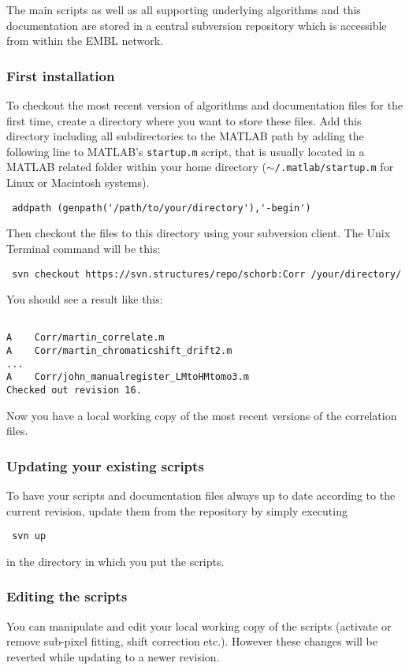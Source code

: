 \documentclass[10pt,a4paper,onepage,DIV12]{scrartcl}
\begin{document}
The main scripts as well as all supporting underlying algorithms and this documentation are stored in a central subversion repository which is accessible from within the EMBL network.
\subsubsection*{First installation}
To checkout the most recent version of algorithms and documentation files for the first time, create a directory where you want to store these files. Add this directory including all subdirectories to the MATLAB path by adding the following line to MATLAB's \texttt{startup.m} script, that is usually located in a MATLAB related folder within your home directory (\texttt{$\sim$/.matlab/startup.m} for Linux or Macintosh systems).
\begin{verbatim}
 addpath (genpath('/path/to/your/directory'),'-begin')
\end{verbatim}
Then checkout the files to this directory using your subversion client. The Unix Terminal command will be this:
\begin{verbatim}
 svn checkout https://svn.structures/repo/schorb:Corr /your/directory/
\end{verbatim}
You should see a result like this:
\begin{verbatim}

A    Corr/martin_correlate.m
A    Corr/martin_chromaticshift_drift2.m
...
A    Corr/john_manualregister_LMtoHMtomo3.m
Checked out revision 16.

\end{verbatim}

Now you have a local working copy of the most recent versions of the correlation files.

\subsubsection*{Updating your existing scripts}

To have your scripts and documentation files always up to date according to the current revision, update them from the repository by simply executing
\begin{verbatim}
 svn up
\end{verbatim}
 in the directory in which you put the scripts. 

\subsubsection*{Editing the scripts}
You can manipulate and edit your local working copy of the scripts (activate or remove sub-pixel fitting, shift correction etc.). However these changes will be reverted while updating to a newer revision. 
\end{document}
